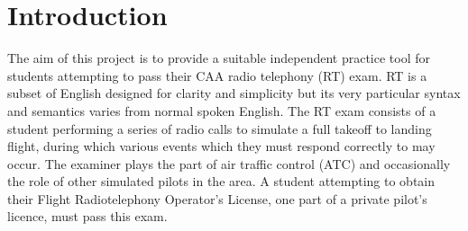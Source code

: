 \section{Introduction}

The aim of this project is to provide a suitable independent practice tool for students attempting to pass their CAA radio telephony (RT) exam. RT is a subset of English designed for clarity and simplicity but its very particular syntax and semantics varies from normal spoken English.
The RT exam consists of a student performing a series of radio calls to simulate a full takeoff to landing flight, during which various events which they must respond correctly to may occur.
The examiner plays the part of air traffic control (ATC) and occasionally the role of other simulated pilots in the area.
A student attempting to obtain their Flight Radiotelephony Operator's License, one part of a private pilot's licence, must pass this exam.